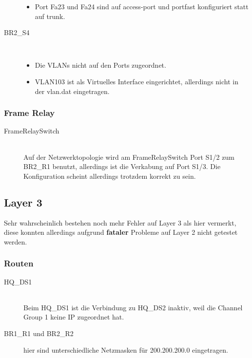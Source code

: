 \begin{description}
\begin{itemize}
		  \item Port Fa23 und Fa24 sind auf access-port und portfast konfiguriert statt auf trunk.
		\end{itemize}
	\item[BR2\_S4] \hfill \\
	  \begin{itemize}
	  	\item Die VLANs nicht auf den Ports zugeordnet.
		  \item VLAN103 ist als Virtuelles Interface eingerichtet, allerdings nicht in der vlan.dat eingetragen.
		\end{itemize}
\end{description}

\subsubsection{Frame Relay}

\begin{description}
	\item[FrameRelaySwitch] \hfill \\
	 Auf der Netzwerktopologie wird am FrameRelaySwitch Port S1/2 zum BR2\_R1 benutzt, allerdings ist die Verkabung auf Port S1/3. Die Konfiguration scheint allerdings trotzdem korrekt zu sein.
\end{description}

\subsection{Layer 3}

Sehr wahrscheinlich bestehen noch mehr Fehler auf Layer 3 als hier vermerkt, diese konnten allerdings aufgrund \textbf{fataler} Probleme auf Layer 2 nicht getestet werden.

\subsubsection{Routen}
\begin{description}
	\item[HQ\_DS1] \hfill \\
	 Beim HQ\_DS1 ist die Verbindung zu HQ\_DS2 inaktiv, weil die Channel Group 1 keine IP zugeordnet hat.
	 \item[BR1\_R1 und BR2\_R2] hier sind unterschiedliche Netzmasken für 200.200.200.0 eingetragen.
\end{description}

